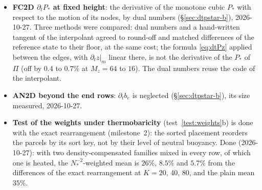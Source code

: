 \documentclass[11pt,a4paper]{article}
\begin{document}
\begin{itemize}
  \item \textbf{FC2D $\partial_tP_*$ at fixed height}: the derivative of the monotone cubic $P_*$ with respect to the motion
        of its nodes, by dual numbers (\S\ref{sec:dtpstar-b}), 2026-10-27. Three methods were compared: dual numbers and a
        hand-written tangent of the interpolant agreed to round-off and matched differences of the reference state to their
        floor, at the same cost; the formula \eqref{eq:dtPz} applied between the edges, with $\partial_tz|_m$ linear there,
        is not the derivative of the $P_*$ of $\Pi$ (off by $0.4$ to $0.7\%$ at $M_z=64$ to $16$). The dual numbers reuse
        the code of the interpolant.
  \item \textbf{AN2D beyond the end rows}: $\partial_tb_e$ is neglected (\S\ref{sec:dtpstar-b}), its size measured,
        2026-10-27.
  \item \textbf{Test of the weights under thermobaricity} (test~\ref{test:weights}b) is done with the exact rearrangement
        (milestone~2): the sorted placement reorders the parcels by its sort key, not by their level of neutral buoyancy.
        Done (2026-10-27): with two density-compensated families mixed in every row, of which one is heated, the
        $N_*^{-2}$-weighted mean is $26\%$, $8.5\%$ and $5.7\%$ from the differences of the exact rearrangement at $K=20$, 40,
        80, and the plain mean $35\%$.
\end{itemize}
\end{document}
